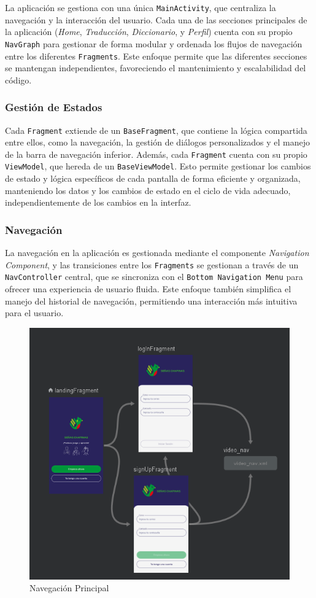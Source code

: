 La aplicación se gestiona con una única \texttt{MainActivity}, que centraliza la navegación y la interacción del usuario. Cada una de las secciones principales de la aplicación (\textit{Home}, \textit{Traducción}, \textit{Diccionario}, y \textit{Perfil}) cuenta con su propio \texttt{NavGraph} para gestionar de forma modular y ordenada los flujos de navegación entre los diferentes \texttt{Fragments}. Este enfoque permite que las diferentes secciones se mantengan independientes, favoreciendo el mantenimiento y escalabilidad del código.

\subsubsection{Gestión de Estados}

Cada \texttt{Fragment} extiende de un \texttt{BaseFragment}, que contiene la lógica compartida entre ellos, como la navegación, la gestión de diálogos personalizados y el manejo de la barra de navegación inferior. Además, cada \texttt{Fragment} cuenta con su propio \texttt{ViewModel}, que hereda de un \texttt{BaseViewModel}. Esto permite gestionar los cambios de estado y lógica específicos de cada pantalla de forma eficiente y organizada, manteniendo los datos y los cambios de estado en el ciclo de vida adecuado, independientemente de los cambios en la interfaz.

\subsubsection{Navegación}

La navegación en la aplicación es gestionada mediante el componente \textit{Navigation Component}, y las transiciones entre los \texttt{Fragments} se gestionan a través de un \texttt{NavController} central, que se sincroniza con el \texttt{Bottom Navigation Menu} para ofrecer una experiencia de usuario fluida. Este enfoque también simplifica el manejo del historial de navegación, permitiendo una interacción más intuitiva para el usuario.

\begin{figure} [H]
    \centering
    \includegraphics[width=0.5\linewidth]{figuras/navegacion_principal.png}
    \caption{Navegación Principal}
    \label{fig:enter-label}
\end{figure}

